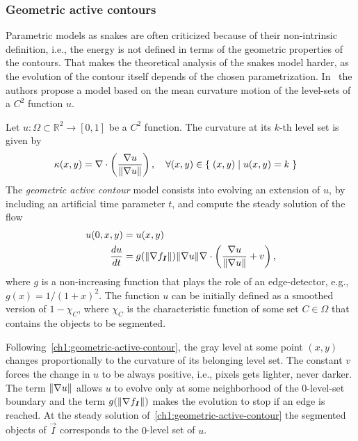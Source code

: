 


\subsubsection{Geometric active contours}
Parametric models as snakes are often criticized because of their non-intrinsic definition, i.e., the energy is not defined in terms of the geometric properties of the contours. That makes the theoretical analysis of the snakes model harder, as the evolution of the contour itself depends of the chosen parametrization. In~\cite{caselles93} the authors propose a model based on the mean curvature motion of the level-sets of a $C^2$ function $u$.


Let $u:\Omega \subset \mathbb{R}^2 \rightarrow [0,1]$ be a $C^2$ function. The curvature at its $k$-th level set is given by
\begin{align*}
	\kappa (x,y) &= \nabla \cdot \left( \frac{\nabla u}{\lVert\nabla u\rVert} \right), \quad \forall (x,y) \in \left\{ \; (x,y) \; | \; u(x,y)=k \; \right\}
\end{align*}
%
%
The \emph{geometric active contour} model consists into evolving an extension of $u$, by including an artificial time parameter $t$, and compute the steady solution of the flow
\begin{align}
	u(0,x,y) &= u(x,y) \nonumber \\
	\frac{du}{dt} &= g( \lVert\nabla f_{\bm{I}}\rVert )\lVert\nabla u\rVert\nabla \cdot \left( \frac{\nabla u}{\lVert\nabla u\rVert}  + v \right),
	\label{ch1:geometric-active-contour}
\end{align}
%
where $g$ is a non-increasing function that plays the role of an edge-detector, e.g., $g(x) = 1/(1+x)^2$. The function $u$ can be initially defined as a smoothed version of $1 - \chi_C$, where $\chi_C$ is the characteristic function of some set $C \in \Omega $ that contains the objects to be segmented. 

Following~\cref{ch1:geometric-active-contour}, the gray level at some point $(x,y)$ changes proportionally to the curvature of its belonging level set. The constant $v$ forces the change in $u$ to be always positive, i.e., pixels gets lighter, never darker. The term $\lVert\nabla u\rVert$ allows $u$ to evolve only at some neighborhood of the $0$-level-set boundary and the term $g(\lVert\nabla f_{\bm{I}}\rVert)$ makes the evolution to stop if an edge is reached. At the steady solution of~\cref{ch1:geometric-active-contour} the segmented objects of $\vec{I}$ corresponds to the $0$-level set of $u$.

